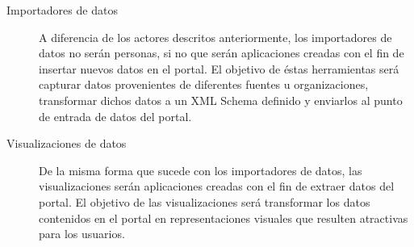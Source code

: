 \begin{description}
\item[Importadores de datos]  A diferencia de los actores descritos anteriormente, los importadores de datos no serán personas, si no que serán aplicaciones creadas con el fin de insertar nuevos datos en el portal.  El objetivo de éstas herramientas será capturar datos provenientes de diferentes fuentes u organizaciones, transformar dichos datos a un XML Schema definido y enviarlos al punto de entrada de datos del portal.
\item[Visualizaciones de datos]  De la misma forma que sucede con los importadores de datos, las visualizaciones serán aplicaciones creadas con el fin de extraer datos del portal.  El objetivo de las visualizaciones será transformar los datos contenidos en el portal en representaciones visuales que resulten atractivas para los usuarios.
\end{description}


